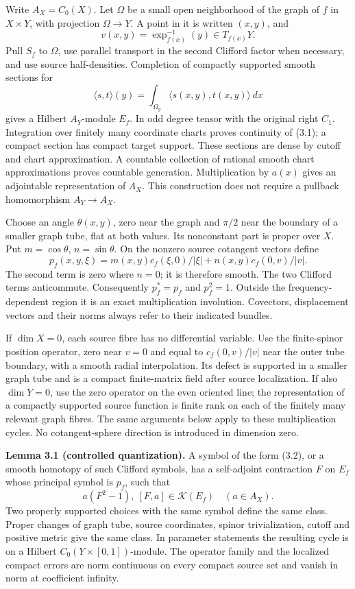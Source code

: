 \documentclass[
  11pt,
]{article}
\begin{document}
Write \(A_X=C_0(X)\). Let \(\Omega\) be a small open neighborhood of the
graph of \(f\) in \(X\times Y\), with projection \(\Omega\to Y\). A
point in it is written \((x,y)\), and \[
 v(x,y)=\exp_{f(x)}^{-1}(y)\in T_{f(x)}Y.
\] Pull \(S_f\) to \(\Omega\), use parallel transport in the second
Clifford factor when necessary, and use source half-densities.
Completion of compactly supported smooth sections for \[
 \langle s,t\rangle(y)=\int_{\Omega_y}\langle s(x,y),t(x,y)\rangle\,dx
 \tag{3.1}
\] gives a Hilbert \(A_Y\)-module \(E_f\). In odd degree tensor with the
original right \(C_1\). Integration over finitely many coordinate charts
proves continuity of (3.1); a compact section has compact target
support. These sections are dense by cutoff and chart approximation. A
countable collection of rational smooth chart approximations proves
countable generation. Multiplication by \(a(x)\) gives an adjointable
representation of \(A_X\). This construction does not require a pullback
homomorphism \(A_Y\to A_X\).

Choose an angle \(\theta(x,y)\), zero near the graph and \(\pi/2\) near
the boundary of a smaller graph tube, flat at both values. Its
nonconstant part is proper over \(X\). Put \(m=\cos\theta\),
\(n=\sin\theta\). On the nonzero source cotangent vectors define \[
 p_f(x,y,\xi)=m(x,y)c_f(\xi,0)/|\xi|
               +n(x,y)c_f(0,v)/|v|.
 \tag{3.2}
\] The second term is zero where \(n=0\); it is therefore smooth. The
two Clifford terms anticommute. Consequently \(p_f^*=p_f\) and
\(p_f^2=1\). Outside the frequency-dependent region it is an exact
multiplication involution. Covectors, displacement vectors and their
norms always refer to their indicated bundles.

If \(\dim X=0\), each source fibre has no differential variable. Use the
finite-spinor position operator, zero near \(v=0\) and equal to
\(c_f(0,v)/|v|\) near the outer tube boundary, with a smooth radial
interpolation. Its defect is supported in a smaller graph tube and is a
compact finite-matrix field after source localization. If also
\(\dim Y=0\), use the zero operator on the even oriented line; the
representation of a compactly supported source function is finite rank
on each of the finitely many relevant graph fibres. The same arguments
below apply to these multiplication cycles. No cotangent-sphere
direction is introduced in dimension zero.

\textbf{Lemma 3.1 (controlled quantization).} A symbol of the form
(3.2), or a smooth homotopy of such Clifford symbols, has a self-adjoint
contraction \(F\) on \(E_f\) whose principal symbol is \(p_f\), such
that \[
 a(F^2-1),\ [F,a]\in\mathcal K(E_f)\quad(a\in A_X).
 \tag{3.3}
\] Two properly supported choices with the same symbol define the same
class. Proper changes of graph tube, source coordinates, spinor
trivialization, cutoff and positive metric give the same class. In
parameter statements the resulting cycle is on a Hilbert
\(C_0(Y\times[0,1])\)-module. The operator family and the localized
compact errors are norm continuous on every compact source set and
vanish in norm at coefficient infinity.
\end{document}

